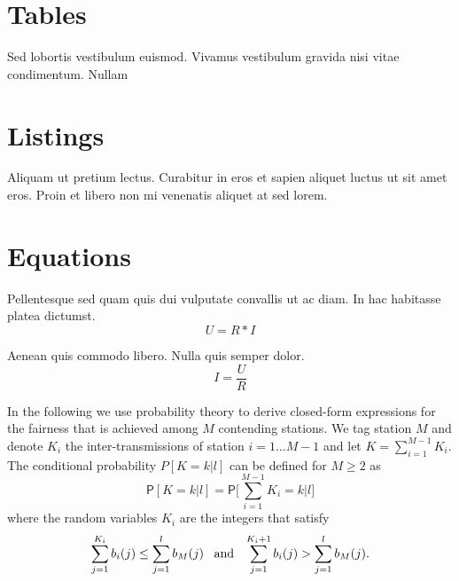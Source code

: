 %
%
\section{Tables}
\label{sec:chapter03:tables}
Sed lobortis vestibulum euismod. Vivamus vestibulum gravida nisi vitae condimentum. Nullam 

%
%
\section{Listings}
\label{sec:chapter03:listings}
Aliquam ut pretium lectus. Curabitur in eros et sapien aliquet luctus ut sit amet eros. Proin et libero non mi venenatis aliquet at sed lorem. 


%
%
\section{Equations}
\label{sec:chapter03:equations}
Pellentesque sed quam quis dui vulputate convallis ut ac diam. In hac habitasse platea dictumst. 
%
\begin{equation}
 U = R * I
\end{equation}

 Aenean quis commodo libero. Nulla quis semper dolor.
%
\begin{equation}
 I = \frac{U}{R} 
\end{equation}

In the following we use probability theory to derive closed-form expressions for the fairness that is achieved among $M$ contending stations. We tag station $M$ and denote $K_i$ the inter-transmissions of station $i = 1 \dots M-1$ and let $K = \sum_{i=1}^{M-1} K_i$. The conditional probability $P[K\!=\!k|l]$ can be defined for $M \ge 2$ as
%
\begin{equation}
\mathsf{P}[K\!=\!k|l] = \mathsf{P} \Biggl[\sum_{i=1}^{M-1} K_i = k \Big| l \Biggr]
\label{eq:chapter03:exactpmf}
\end{equation}
%
where the random variables $K_i$ are the integers that satisfy
%
\begin{equation*}
\sum_{j=1}^{K_i} b_i(j) \le \sum_{j=1}^{l} b_M(j) \;\;\; \textmd{and} \;\;\; \sum_{j=1}^{K_i+1} b_i(j) > \sum_{j=1}^{l} b_M(j) .
\end{equation*}


%
%
